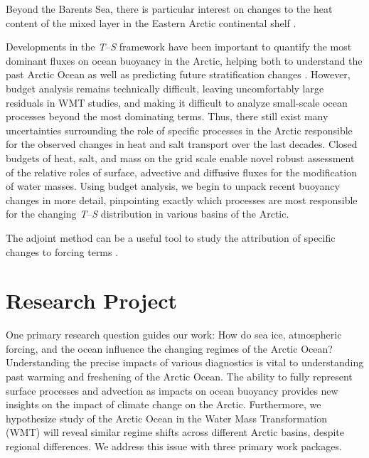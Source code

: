 \documentclass[a4paper,12pt]{article}
\begin{document}
    Beyond the Barents Sea, there is particular interest on changes to the heat content of the mixed layer in the Eastern Arctic continental shelf \cite{Schulz2022}. \cite{Polyakov2017}

    Developments in the \emph{T}--\emph{S} framework have been important to quantify the most dominant fluxes on ocean buoyancy in the Arctic, helping both to understand the past Arctic Ocean as well as predicting future stratification changes \cite{Pemberton2015}. However, budget analysis remains technically difficult, leaving uncomfortably large residuals in WMT studies, and making it difficult to analyze small-scale ocean processes beyond the most dominating terms. Thus, there still exist many uncertainties surrounding the role of specific processes in the Arctic responsible for the observed changes in heat and salt transport over the last decades. Closed budgets of heat, salt, and mass on the grid scale enable novel robust assessment of the relative roles of surface, advective and diffusive fluxes for the modification of water masses. Using budget analysis, we begin to unpack recent buoyancy changes in more detail, pinpointing exactly which processes are most responsible for the changing \emph{T}--\emph{S} distribution in various basins of the Arctic.

    The adjoint method can be a useful tool to study the attribution of specific changes to forcing terms \cite{Heimbach2011,Pillar2016,Smith2019,Nguyen2020}.
    

    \section{Research Project}
    One primary research question guides our work: How do sea ice, atmospheric forcing, and the ocean influence the changing regimes of the Arctic Ocean? Understanding the precise impacts of various diagnostics is vital to understanding past warming and freshening of the Arctic Ocean. The ability to fully represent surface processes and advection as impacts on ocean buoyancy provides new insights on the impact of climate change on the Arctic. Furthermore, we hypothesize study of the Arctic Ocean in the Water Mass Transformation (WMT) will reveal similar regime shifts across different Arctic basins, despite regional differences. We address this issue with three primary work packages.
\end{document}
